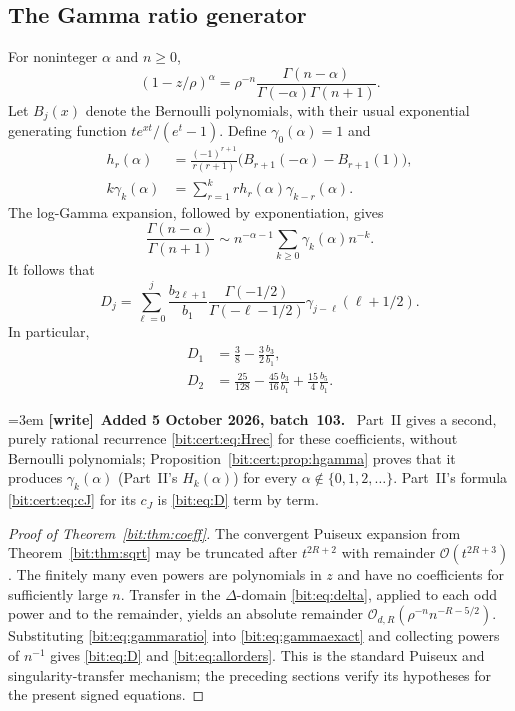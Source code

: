 \documentclass[11pt]{article}
\theoremstyle{definition}\newtheorem{definition}[theorem]{Definition}
\theoremstyle{remark}\newtheorem{remark}[theorem]{Remark}
\newcommand{\bigO}{\mathcal O}
\newenvironment{writenote}[1][]{\par\smallskip\begingroup\small\emergencystretch=3em
 \noindent\textbf{[write]}\if\relax\detokenize{#1}\relax\else~\textbf{#1.}\fi\ }%
 {\par\endgroup\smallskip}
\begin{document}
\subsection{The Gamma ratio generator}
For noninteger $\alpha$ and $n\ge0$,
\begin{equation}
 [z^n](1-z/\rho)^\alpha
 =\rho^{-n}\frac{\Gamma(n-\alpha)}{\Gamma(-\alpha)\Gamma(n+1)}.
 \label{bit:eq:gammaexact}
\end{equation}
Let $B_j(x)$ denote the Bernoulli polynomials, with their usual exponential generating function $te^{xt}/(e^t-1)$. Define $\gamma_0(\alpha)=1$ and
\begin{align}
 h_r(\alpha)&=\frac{(-1)^{r+1}}{r(r+1)}
    \bigl(B_{r+1}(-\alpha)-B_{r+1}(1)\bigr),\label{bit:eq:h}\\
 k\gamma_k(\alpha)&=\sum_{r=1}^k r h_r(\alpha)\gamma_{k-r}(\alpha).
 \label{bit:eq:gamma}
\end{align}
The log-Gamma expansion, followed by exponentiation, gives
\begin{equation}
 \frac{\Gamma(n-\alpha)}{\Gamma(n+1)}
 \sim n^{-\alpha-1}\sum_{k\ge0}\gamma_k(\alpha)n^{-k}.
 \label{bit:eq:gammaratio}
\end{equation}
It follows that
\begin{equation}
 D_j=\sum_{\ell=0}^j\frac{b_{2\ell+1}}{b_1}
 \frac{\Gamma(-1/2)}{\Gamma(-\ell-1/2)}
 \gamma_{j-\ell}(\ell+1/2).
 \label{bit:eq:D}
\end{equation}
In particular,
\begin{align}
 D_1&=\frac38-\frac32\frac{b_3}{b_1},\label{bit:eq:D1}\\
 D_2&=\frac{25}{128}-\frac{45}{16}\frac{b_3}{b_1}
                         +\frac{15}{4}\frac{b_5}{b_1}.
 \label{bit:eq:D2}
\end{align}
\begin{writenote}[Added 5 October 2026, batch~103]
Part~II gives a second, purely rational recurrence
\eqref{bit:cert:eq:Hrec} for these coefficients, without Bernoulli
polynomials; Proposition~\ref{bit:cert:prop:hgamma} proves that it produces
$\gamma_k(\alpha)$ (Part~II's $H_k(\alpha)$) for every
$\alpha\notin\{0,1,2,\ldots\}$. Part~II's formula \eqref{bit:cert:eq:cJ}
for its $c_J$ is \eqref{bit:eq:D} term by term.
\end{writenote}

\begin{proof}[Proof of Theorem~\ref{bit:thm:coeff}]
The convergent Puiseux expansion from Theorem~\ref{bit:thm:sqrt} may be truncated after $t^{2R+2}$ with remainder $\bigO(t^{2R+3})$. The finitely many even powers are polynomials in $z$ and have no coefficients for sufficiently large $n$. Transfer in the $\Delta$-domain \eqref{bit:eq:delta}, applied to each odd power and to the remainder, yields an absolute remainder
$\bigO_{d,R}(\rho^{-n}n^{-R-5/2})$. Substituting \eqref{bit:eq:gammaratio} into \eqref{bit:eq:gammaexact} and collecting powers of $n^{-1}$ gives \eqref{bit:eq:D} and \eqref{bit:eq:allorders}. This is the standard Puiseux and singularity-transfer mechanism; the preceding sections verify its hypotheses for the present signed equations.
\end{proof}
\end{document}
